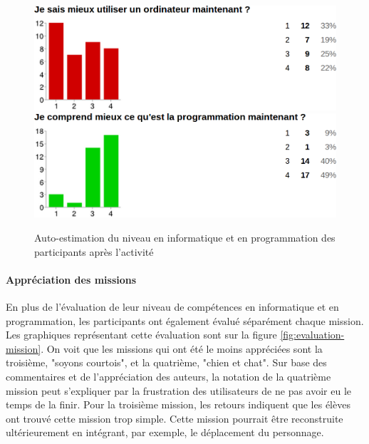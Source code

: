 \begin{figure}
  \begin{center}
    \includegraphics[width=.7\textwidth]{content/8-validation/images/apres}
    \includegraphics[width=.7\textwidth]{content/8-validation/images/apres-programmation}
    \caption{Auto-estimation du niveau en informatique et en programmation des participants après l'activité}
    \label{fig:niveau-apres}
  \end{center}
\end{figure}

\paragraph{Appréciation des missions}
\label{appreciation}
En plus de l'évaluation de leur niveau de compétences en informatique et en programmation, les participants ont également évalué séparément chaque mission. Les graphiques représentant cette évaluation sont sur la figure \ref{fig:evaluation-mission}. On voit que les missions qui ont été le moins appréciées sont la troisième, "soyons courtois", et la quatrième, "chien et chat".
Sur base des commentaires et de l'appréciation des auteurs, la notation de la quatrième mission peut s'expliquer par la frustration des utilisateurs de ne pas avoir eu le temps de la finir.
Pour la troisième mission, les retours indiquent que les élèves ont trouvé cette mission trop simple. Cette mission pourrait être reconstruite ultérieurement en intégrant, par exemple, le déplacement du personnage.\\


